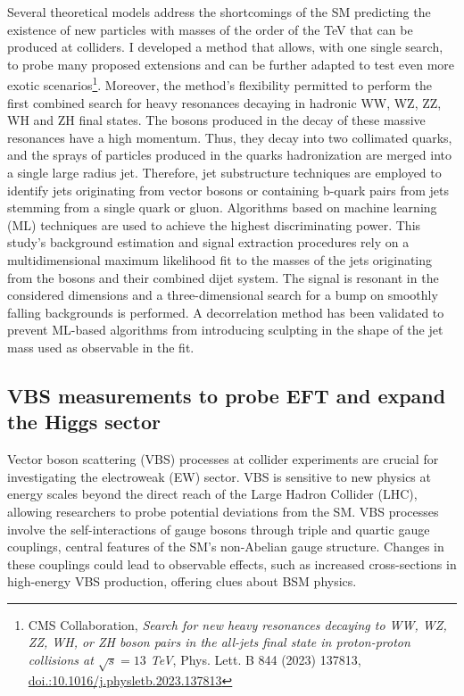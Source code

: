 {\begin{flushleft}
Several theoretical models address the shortcomings of the SM predicting the existence of new particles with masses of the order of the TeV that can be produced at colliders. I developed a method that allows, with one single search, to probe many proposed extensions and can be further adapted to test even more exotic scenarios\footnote{CMS Collaboration, {\em Search for new heavy resonances decaying to WW, WZ, ZZ, WH, or ZH boson pairs in the all-jets final state in proton-proton collisions at $\sqrt{s}=13$ TeV}, Phys. Lett. B 844 (2023) 137813, \href{http://dx.doi.org/10.1016/j.physletb.2023.137813}{doi.:10.1016/j.physletb.2023.137813}}. Moreover, the method’s flexibility permitted to perform the first combined search for heavy resonances decaying in hadronic WW, WZ, ZZ, WH and ZH final states. The bosons produced in the decay of these massive resonances have a high momentum. Thus, they decay into two collimated quarks, and the sprays of particles produced in the quarks hadronization are merged into a single large radius jet. Therefore, jet substructure techniques are employed to identify jets originating from vector bosons or containing b-quark pairs from jets stemming from a single quark or gluon. Algorithms based on machine learning (ML) techniques are used to achieve the highest discriminating power. This study’s background estimation and signal extraction procedures rely on a multidimensional maximum likelihood fit to the masses of the jets originating from the bosons and their combined dijet system. The signal is resonant in the considered dimensions and a three-dimensional search for a bump on smoothly falling backgrounds is performed. A decorrelation method has been validated to prevent ML-based algorithms from introducing sculpting in the shape of the jet mass used as observable in the fit.
\vspace{\baselineskip}
\subsection{VBS measurements to probe EFT and expand the Higgs sector}
\vspace{\baselineskip}
Vector boson scattering (VBS) processes at collider experiments are crucial for investigating the electroweak (EW) sector. VBS is sensitive to new physics at energy scales beyond the direct reach of the Large Hadron Collider (LHC), allowing researchers to probe potential deviations from the SM. VBS processes involve the self-interactions of gauge bosons through triple and quartic gauge couplings, central features of the SM's non-Abelian gauge structure. Changes in these couplings could lead to observable effects, such as increased cross-sections in high-energy VBS production, offering clues about BSM physics.


\end{flushleft}}
